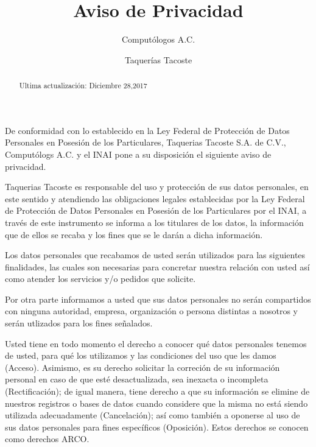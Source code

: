 \documentclass{article}
\title{Aviso de Privacidad}
\author{Computólogos A.C.  \\
	\and 
	Taquerías Tacoste
	}
\date{}
\begin{document}
\maketitle


\begin{abstract}
Ultima actualización: Diciembre 28,2017
\end{abstract}

\vspace{4mm}
\noindent

De conformidad con lo establecido en la Ley Federal de Protección de Datos Personales en Posesión de los Particulares,
Taquerias Tacoste S.A. de C.V., Computólogs A.C. y el INAI pone a su disposición el siguiente aviso de privacidad.

\vspace{4mm}
\noindent
Taquerias Tacoste es responsable del uso y protección de sus datos personales, en este sentido y atendiendo las obligaciones
legales establecidas por la Ley Federal de Protección de Datos Personales en Posesión de los Particulares por el INAI, a través
de este instrumento se informa a los titulares de los datos, la información que de ellos se recaba y los fines que se le darán
a dicha información.

\vspace{4mm}
\noindent
Los datos personales que recabamos de usted serán utilizados para las siguientes finalidades, las cuales son necesarias para 
concretar nuestra relación con usted así como atender los servicios  y/o pedidos que solicite.

\vspace{4mm}
\noindent
Por otra parte informamos a usted que sus datos personales no serán compartidos con ninguna autoridad, empresa, organización o
persona distintas a nosotros y serán utlizados para los fines señalados.

\vspace{4mm}
\noindent
Usted tiene en todo momento el derecho a conocer qué datos personales tenemos de usted, para qué los utilizamos y las condiciones del uso que les damos (Acceso). Asimismo, es su derecho solicitar la correción de su información personal en caso de que esté desactualizada, sea inexacta o incompleta (Rectificación); de igual manera, tiene derecho a que su información se elimine de nuestros registros o bases de datos cuando considere que la misma no está siendo utilizada adecuadamente (Cancelación); así como también a oponerse al uso de sus datos personales para fines específicos (Oposición). Estos derechos se conocen como derechos ARCO.
\end{document}
